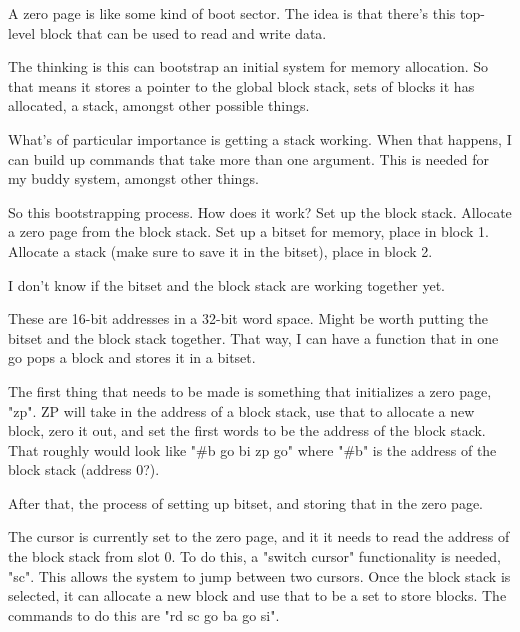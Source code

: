 A zero page is like some kind of boot sector. The idea is that there's this top-level block that can be used to read and write data.
\par

The thinking is this can bootstrap an initial system for memory allocation. So that means it stores a pointer to the global block stack, sets of blocks it has allocated, a stack, amongst other possible things.
\par

What's of particular importance is getting a stack working. When that happens, I can build up commands that take more than one argument. This is needed for my buddy system, amongst other things.
\par

So this bootstrapping process. How does it work? Set up the block stack. Allocate a zero page from the block stack. Set up a bitset for memory, place in block 1. Allocate a stack (make sure to save it in the bitset), place in block 2.
\par

I don't know if the bitset and the block stack are working together yet.
\par

These are 16-bit addresses in a 32-bit word space. Might be worth putting the bitset and the block stack together. That way, I can have a function that in one go pops a block and stores it in a bitset.
\par

The first thing that needs to be made is something that initializes a zero page, "zp". ZP will take in the address of a block stack, use that to allocate a new block, zero it out, and set the first words to be the address of the block stack. That roughly would look like "\#b go bi zp go" where "\#b" is the address of the block stack (address 0?).
\par

After that, the process of setting up bitset, and storing that in the zero page.
\par

The cursor is currently set to the zero page, and it it needs to read the address of the block stack from slot 0. To do this, a "switch cursor" functionality is needed, "sc". This allows the system to jump between two cursors. Once the block stack is selected, it can allocate a new block and use that to be a set to store blocks. The commands to do this are "rd sc go ba go si".
\par

